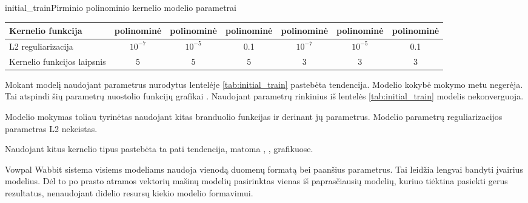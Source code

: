 \begin{ktutable}{initial_train}{Pirminio polinominio kernelio modelio parametrai}
    \begin{tabular}{| l | c | c | c | c | c | c | }
    \hline
        Kernelio funkcija & polinominė & polinominė & polinominė & polinominė & polinominė & polinominė \\ \hline
        L2 reguliarizacija & $10^{-7}$ & $10^{-5}$ & 0.1 & $10^{-7}$ & $10^{-5}$ & 0.1 \\ \hline
        Kernelio funkcijos laipsnis & 5 & 5 & 5 & 3 & 3 & 3 \\ \hline
    \end{tabular}
\end{ktutable}

Mokant modelį naudojant parametrus nurodytus lentelėje \vref{tab:initial_train} pastebėta tendencija.
Modelio kokybė mokymo metu negerėja. Tai atspindi šių parametrų nuostolio funkcijų grafikai
. Naudojant parametrų rinkinius iš lentelės \vref{tab:initial_train}
modelis nekonverguoja.


Modelio mokymas toliau tyrinėtas naudojant kitas branduolio funkcijas ir derinant jų parametrus.
Modelio parametrų reguliarizacijos parametras L2 nekeistas.


Naudojant kitus kernelio tipus pastebėta ta pati tendencija, matoma , ,  grafikuose.


Vowpal Wabbit sistema visiems modeliams naudoja vienodą duomenų formatą bei paanšius parametrus.
Tai leidžia lengvai bandyti įvairius modelius. Dėl to po prasto atramos vektorių mašinų modelių
pasirinktas vienas iš paprasčiausių modelių, kuriuo tiėktina pasiekti gerus rezultatus, nenaudojant
didelio resursų kiekio modelio formavimui.

